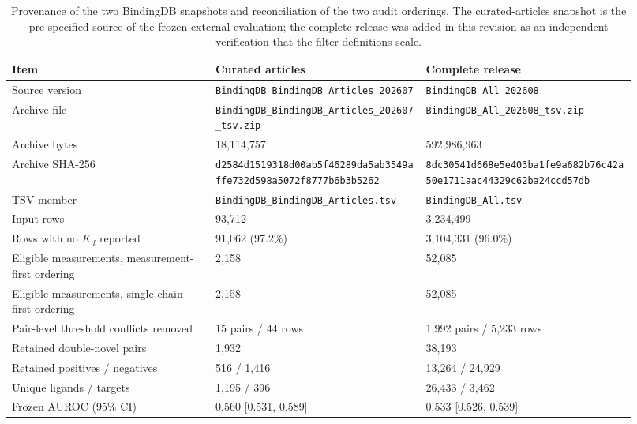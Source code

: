 \documentclass[11pt]{article}
\begin{document}
\begin{table}[H]
\centering
\small
\caption{Provenance of the two BindingDB snapshots and reconciliation of the two
audit orderings. The curated-articles snapshot is the pre-specified source of
the frozen external evaluation; the complete release was added in this revision
as an independent verification that the filter definitions scale.}
\begin{tabular}{p{0.30\linewidth}p{0.31\linewidth}p{0.31\linewidth}}
\toprule
Item & Curated articles & Complete release \\
\midrule
Source version & {\scriptsize\texttt{BindingDB\_BindingDB\_\linebreak[0]Articles\_202607}} & \texttt{BindingDB\_All\_202608} \\
Archive file & {\scriptsize\texttt{BindingDB\_BindingDB\_\linebreak[0]Articles\_202607\_tsv.zip}} & \texttt{\scriptsize BindingDB\_All\_202608\_tsv.zip} \\
Archive bytes & 18{,}114{,}757 & 592{,}986{,}963 \\
Archive SHA-256 & {\scriptsize\texttt{d2584d1519318d00ab5f46289da5ab35\linebreak[0]49affe732d598a5072f8777b6b3b5262}} & {\scriptsize\texttt{8dc30541d668e5e403ba1fe9a682b76c\linebreak[0]42a50e1711aac44329c62ba24ccd57db}} \\
TSV member & {\scriptsize\texttt{BindingDB\_BindingDB\_\linebreak[0]Articles.tsv}} & \texttt{BindingDB\_All.tsv} \\
Input rows & 93{,}712 & 3{,}234{,}499 \\
Rows with no $K_d$ reported & 91{,}062 (97.2\%) & 3{,}104{,}331 (96.0\%) \\
Eligible measurements, measurement-first ordering & 2{,}158 & 52{,}085 \\
Eligible measurements, single-chain-first ordering & 2{,}158 & 52{,}085 \\
Pair-level threshold conflicts removed & 15 pairs / 44 rows & 1{,}992 pairs / 5{,}233 rows \\
Retained double-novel pairs & 1{,}932 & 38{,}193 \\
Retained positives / negatives & 516 / 1{,}416 & 13{,}264 / 24{,}929 \\
Unique ligands / targets & 1{,}195 / 396 & 26{,}433 / 3{,}462 \\
Frozen AUROC (95\% CI) & 0.560 [0.531, 0.589] & 0.533 [0.526, 0.539] \\

\end{tabular}
\end{table}
\end{document}
